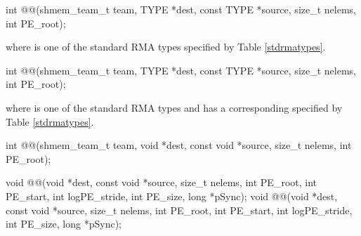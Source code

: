 
\begin{apidefinition}

{\color{Green}
\begin{C11synopsis}
int @@(shmem_team_t team, TYPE *dest, const TYPE *source, size_t nelems, int PE_root);
\end{C11synopsis}
where \TYPE{} is one of the standard \ac{RMA} types specified by Table \ref{stdrmatypes}.
}

\begin{Csynopsis}
\end{Csynopsis}
{\color{Green}
\begin{CsynopsisCol}
int @@(shmem_team_t team, TYPE *dest, const TYPE *source, size_t nelems, int PE_root);
\end{CsynopsisCol}
where \TYPE{} is one of the standard \ac{RMA} types and has a corresponding \TYPENAME{} specified by Table \ref{stdrmatypes}.

\begin{CsynopsisCol}
int @@(shmem_team_t team, void *dest, const void *source, size_t nelems, int PE_root);
\end{CsynopsisCol}
}
\begin{DeprecateBlock}
\begin{CsynopsisCol}
void @@(void *dest, const void *source, size_t nelems, int PE_root, int PE_start, int logPE_stride, int PE_size, long *pSync);
void @@(void *dest, const void *source, size_t nelems, int PE_root, int PE_start, int logPE_stride, int PE_size, long *pSync);
\end{CsynopsisCol}
\end{DeprecateBlock}

\begin{apiarguments}




\end{apiarguments}
\end{apidefinition}
